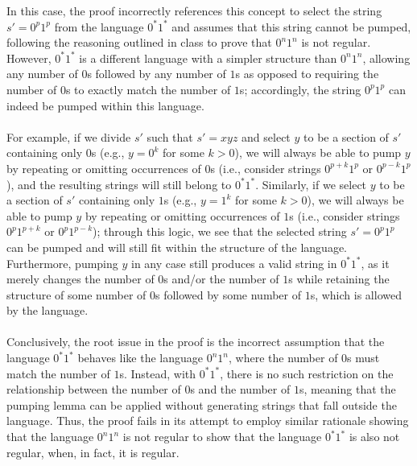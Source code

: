 \documentclass[12pt]{article}
\begin{document}
{In this case, the proof incorrectly references this concept to select the string $s' = 0^p1^p$ from the language $0^*1^*$ and assumes that this string cannot be pumped, following the reasoning outlined in class to prove that $0^n1^n$ is not regular. However, $0^*1^*$ is a different language with a simpler structure than $0^n1^n$, allowing any number of $0$s followed by any number of $1$s as opposed to requiring the number of $0$s to exactly match the number of $1$s; accordingly, the string $0^p1^p$ can indeed be pumped within this language.\\
\\
For example, if we divide $s'$ such that $s' = xyz$ and select $y$ to be a section of $s'$ containing only $0$s (e.g., $y = 0^k$ for some $k > 0$), we will always be able to pump $y$ by repeating or omitting occurrences of $0$s (i.e., consider strings $0^{p+k}1^p$ or $0^{p-k}1^p$), and the resulting strings will still belong to $0^*1^*$. Similarly, if we select $y$ to be a section of $s'$ containing only $1$s (e.g., $y = 1^k$ for some $k > 0$), we will always be able to pump $y$ by repeating or omitting occurrences of $1$s (i.e., consider strings $0^p1^{p+k}$ or $0^p1^{p-k}$); through this logic, we see that the selected string $s' = 0^p1^p$ can be pumped and will still fit within the structure of the language. Furthermore, pumping $y$ in any case still produces a valid string in $0^*1^*$, as it merely changes the number of $0$s and/or the number of $1$s while retaining the structure of some number of $0$s followed by some number of $1$s, which is allowed by the language.\\
\\
Conclusively, the root issue in the proof is the incorrect assumption that the language $0^*1^*$ behaves like the language $0^n1^n$, where the number of $0$s must match the number of $1$s. Instead, with $0^*1^*$, there is no such restriction on the relationship between the number of $0$s and the number of $1$s, meaning that the pumping lemma can be applied without generating strings that fall outside the language. Thus, the proof fails in its attempt to employ similar rationale showing that the language $0^n1^n$ is not regular to show that the language $0^*1^*$ is also not regular, when, in fact, it is regular.
}

\vspace{12pt}
\end{document}
